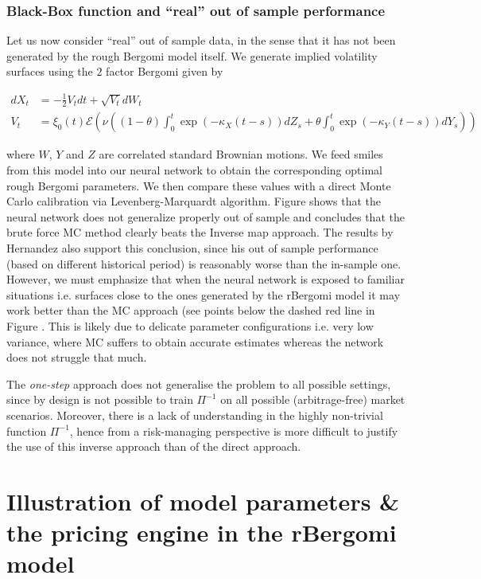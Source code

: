 \documentclass{article}
\theoremstyle{remark}
\begin{document}
\subsubsection*{Black-Box function and ``real'' out of sample performance}
Let us now consider ``real'' out of sample data, in the sense that it has not
been generated by the rough Bergomi model itself. We generate implied
volatility surfaces using the $2$ factor Bergomi given by

\begin{align*} dX_t&=-\frac{1}{2} V_t dt +\sqrt{V_t} dW_t \\
V_t&=\xi_0(t)\mathcal{E}\left(\nu \left((1-\theta)\int_0^t \exp(-\kappa_X(t-s))dZ_s+\theta \int_0^t \exp(-\kappa_Y(t-s))dY_s\right)\right)
\end{align*}

where $W$, $Y$ and $Z$ are correlated standard Brownian motions. We feed smiles from this model into our neural network to
obtain the corresponding optimal rough Bergomi parameters. We then compare
these values with a direct Monte Carlo calibration via Levenberg-Marquardt
\cite{Levenberg,Marquardt} algorithm. Figure  shows that the
neural network does not generalize properly out of sample and concludes that
the brute force MC method clearly beats the Inverse map approach. The results
by Hernandez \cite{Hernandez} also support this conclusion, since his out of
sample performance (based on different historical period) is reasonably worse
than the in-sample one. However, we must emphasize that when the neural
network is exposed to familiar situations i.e. surfaces close to the ones
generated by the rBergomi model it may work better than the MC approach (see
points below the dashed red line in Figure . This is likely
due to delicate parameter configurations i.e. very low variance, where MC
suffers to obtain accurate estimates whereas the network does not struggle
that much.

The \emph{one-step} approach does not generalise the
problem to all possible settings, since by
design is not possible to train $\Pi^{-1}$ on all possible (arbitrage-free)
market scenarios. Moreover, there is a
lack of understanding in the highly non-trivial function $\Pi^{-1}$, hence from a
risk-managing perspective is more difficult to justify the use of this inverse
approach than of the direct approach. 

\newpage
\section{Illustration of model parameters \& the pricing engine in the rBergomi model}
\end{document}
